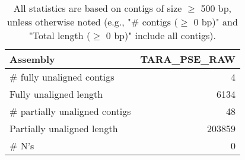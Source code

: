 \documentclass[12pt,a4paper]{article}
\begin{document}
\begin{table}[ht]
\begin{center}
\caption{All statistics are based on contigs of size $\geq$ 500 bp, unless otherwise noted (e.g., "\# contigs ($\geq$ 0 bp)" and "Total length ($\geq$ 0 bp)" include all contigs).}
\begin{tabular}{|l*{1}{|r}|}
\hline
Assembly & TARA\_PSE\_RAW \\ \hline
\# fully unaligned contigs & 4 \\ \hline
Fully unaligned length & 6134 \\ \hline
\# partially unaligned contigs & 48 \\ \hline
Partially unaligned length & 203859 \\ \hline
\# N's & 0 \\ \hline
\end{tabular}
\end{center}
\end{table}
\end{document}
